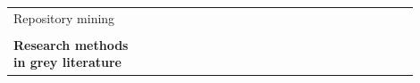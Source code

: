 \documentclass[english, 12pt, a4paper, sci, utf8, a-1b, online]{aaltothesis}
\begin{document}
\begin{center}
\begin{longtable}{p{0.3\linewidth}p{0.6\linewidth}}
    Repository mining                            & \textcite{fontao2017facing} \newline \textcite{de2017towards} \newline \textcite{claussen2019role}                                                                                                                                                                                                                                                                                                                                                                                                                                                                                                                                                                                                                                                                                                                                                                                                                                                 \\
                                                 &                                                                                                                                                                                                                                                                                                                                                                                                                                                                                                                                                                                                                                                                                                                                                                                                                                                                                                                                                    \\
    \textbf{Research methods in grey literature}                                                                                                                                                                                                                                                                                                                                                                                                                                                                                                                                                                                                                                                                                                                                                                                                                                                                                                                                                      \\

\end{longtable}
\end{center}
\end{document}
